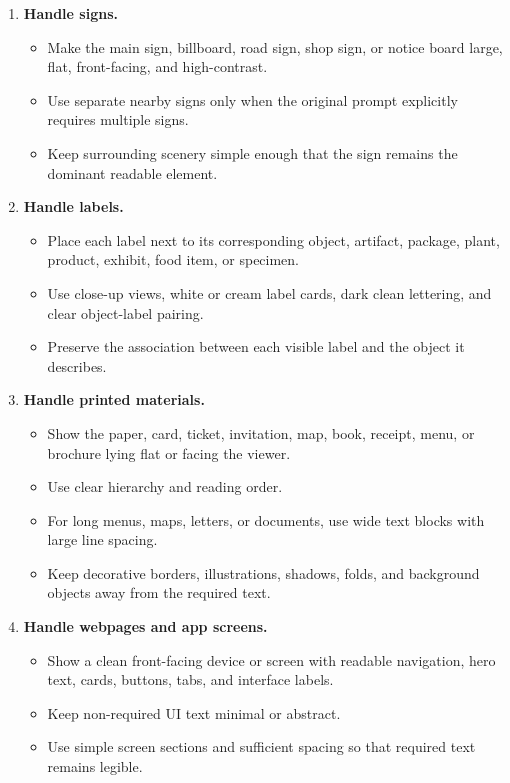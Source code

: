 \begin{tcolorbox}
\begin{enumerate}[leftmargin=1.5em, itemsep=0.2em, topsep=0.2em, parsep=0pt, partopsep=0pt]
    \item \textbf{Handle signs.}
    \begin{itemize}[leftmargin=1.5em, itemsep=0pt, topsep=0pt, parsep=0pt, partopsep=0pt]
        \item Make the main sign, billboard, road sign, shop sign, or notice board large, flat, front-facing, and high-contrast.
        \item Use separate nearby signs only when the original prompt explicitly requires multiple signs.
        \item Keep surrounding scenery simple enough that the sign remains the dominant readable element.
    \end{itemize}

    \item \textbf{Handle labels.}
    \begin{itemize}[leftmargin=1.5em, itemsep=0pt, topsep=0pt, parsep=0pt, partopsep=0pt]
        \item Place each label next to its corresponding object, artifact, package, plant, product, exhibit, food item, or specimen.
        \item Use close-up views, white or cream label cards, dark clean lettering, and clear object-label pairing.
        \item Preserve the association between each visible label and the object it describes.
    \end{itemize}

    \item \textbf{Handle printed materials.}
    \begin{itemize}[leftmargin=1.5em, itemsep=0pt, topsep=0pt, parsep=0pt, partopsep=0pt]
        \item Show the paper, card, ticket, invitation, map, book, receipt, menu, or brochure lying flat or facing the viewer.
        \item Use clear hierarchy and reading order.
        \item For long menus, maps, letters, or documents, use wide text blocks with large line spacing.
        \item Keep decorative borders, illustrations, shadows, folds, and background objects away from the required text.
    \end{itemize}

    \item \textbf{Handle webpages and app screens.}
    \begin{itemize}[leftmargin=1.5em, itemsep=0pt, topsep=0pt, parsep=0pt, partopsep=0pt]
        \item Show a clean front-facing device or screen with readable navigation, hero text, cards, buttons, tabs, and interface labels.
        \item Keep non-required UI text minimal or abstract.
        \item Use simple screen sections and sufficient spacing so that required text remains legible.
    \end{itemize}


\end{enumerate}
\end{tcolorbox}
